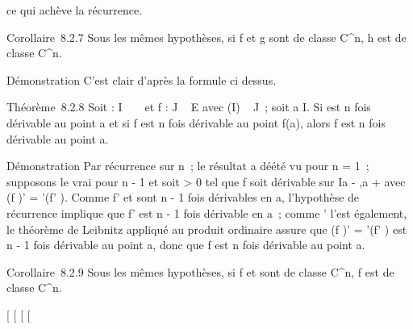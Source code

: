 \documentclass[]{article}
\begin{document}
ce qui achève la récurrence.

Corollaire~8.2.7 Sous les mêmes hypothèses, si f et g sont de classe
C^n, h est de classe C^n.

Démonstration C'est clair d'après la formule ci dessus.

Théorème~8.2.8 Soit \phi : I \rightarrow~ ~ et f : J \rightarrow~ E avec \phi(I) \subset~ J~; soit a \in I.
Si \phi est n fois dérivable au point a et si f est n fois dérivable au
point f(a), alors f \cdot \phi est n fois dérivable au point a.

Démonstration Par récurrence sur n~; le résultat a dé été vu pour n =
1~; supposons le vrai pour n - 1 et soit \eta \textgreater{} 0 tel que f \cdot
\phi soit dérivable sur I\bigcap{]}a - \eta,a + \eta{[} avec (f \cdot \phi)' = \phi'(f' \cdot \phi).
Comme f' et \phi sont n - 1 fois dérivables en a, l'hypothèse de récurrence
implique que f' \cdot \phi est n - 1 fois dérivable en a~; comme \phi' l'est
également, le théorème de Leibnitz appliqué au produit ordinaire assure
que (f \cdot \phi)' = \phi'(f' \cdot \phi) est n - 1 fois dérivable au point a, donc que
f \cdot \phi est n fois dérivable au point a.

Corollaire~8.2.9 Sous les mêmes hypothèses, si f et \phi sont de classe
C^n, f \cdot \phi est de classe C^n.

{[}
{[}
{[}
{[}
\end{document}
